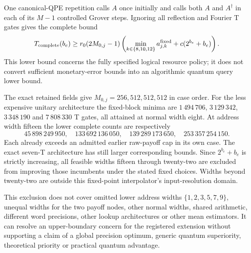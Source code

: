 One canonical-QPE repetition calls $A$ once initially and calls both
$A$ and $A^\dagger$ in each of its $M-1$ controlled Grover steps.
Ignoring all reflection and Fourier T gates gives the complete bound
\[
 T_{\rm complete}(b_e)
 \geq r_0(2M_{0,j}-1)
       \left(\min_{k\in\{8,10,12\}}a^{\rm fixed}_{j,k}
             +c(2^{b_e}+b_e)\right).
\]
This lower bound concerns the fully specified logical resource policy;
it does not convert sufficient monetary-error bounds into an algorithmic
quantum query lower bound.

The exact retained fields give $M_{0,j}=256,512,512,512$ in case order.
For the less expensive unitary architecture the fixed-block minima are
$1\,494\,706$, $3\,129\,342$, $3\,348\,190$ and $7\,808\,330$ T gates,
all attained at normal width eight. At address width fifteen the lower
complete counts are respectively
\[
45\,898\,249\,950,\quad133\,692\,136\,050,\quad
139\,289\,173\,650,\quad253\,357\,254\,150.
\]
Each already exceeds an admitted earlier raw-payoff cap in its own case.
The exact seven-T architecture has still larger corresponding bounds.
Since $2^{b_e}+b_e$ is strictly increasing, all feasible widths fifteen
through twenty-two are excluded from improving those incumbents under
the stated fixed choices. Widths beyond twenty-two are outside this
fixed-point interpolator's input-resolution domain.

This exclusion does not cover omitted lower address widths
$\{1,2,3,5,7,9\}$, unequal widths for the two payoff nodes, other normal
widths, shared arithmetic, different word precisions, other lookup
architectures or other mean estimators. It can resolve an upper-boundary
concern for the registered extension without supporting a claim of a
global precision optimum, generic quantum superiority, theoretical
priority or practical quantum advantage.
